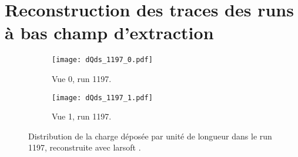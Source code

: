 %
%

  \section{Reconstruction des traces des runs à bas champ d'extraction}\label{sec::rawdatasoft}

    \begin{figure}[htbp]
      \centering
      \begin{subfigure}[t]{0.48\textwidth}
        \centering
        \texttt{[image: dQds\_1197\_0.pdf]}
        \caption{Vue 0, run 1197.}
      \end{subfigure}\hfill
      \begin{subfigure}[t]{0.48\textwidth}
        \centering
        \texttt{[image: dQds\_1197\_1.pdf]}
        \caption{Vue 1, run 1197.}
      \end{subfigure}
      \caption[Distribution de la charge déposée par unité de longueur dans le \TOO{}]{\label{fig::dqds_1197}Distribution de la charge déposée par unité de longueur dans le run 1197, reconstruite avec \gls{larsoft} .}
    \end{figure}

